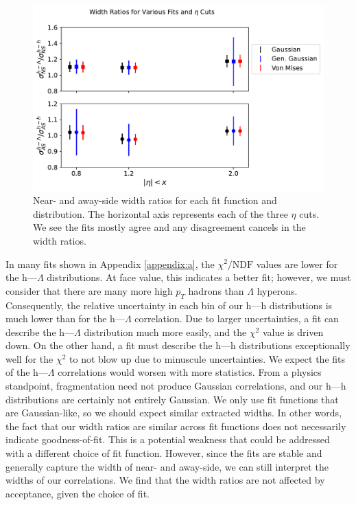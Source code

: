 \documentclass[../main.tex]{subfiles}
\begin{document}
\begin{figure}[h]
    \centering
    \includegraphics[scale=0.7]{results/figs/ratios-across-fits.pdf}
    \caption{Near- and away-side width ratios for each fit function and distribution. The horizontal axis represents each of the three $\eta$ cuts. We see the fits mostly agree and any disagreement cancels in the width ratios.}
    \label{fig:fit_ratios}
\end{figure}

In many fits shown in Appendix \ref{appendix:a}, the $\chi^2/\text{NDF}$ values are lower for the h---$\Lambda$ distributions. At face value, this indicates a better fit; however, we must consider that there are many more high $p_T$ hadrons than $\Lambda$ hyperons. Consequently, the relative uncertainty in each bin of our h---h distributions is much lower than for the h---$\Lambda$ correlation. Due to larger uncertainties, a fit can describe the h---$\Lambda$ distribution much more easily, and the $\chi^2$ value is driven down. On the other hand, a fit must describe the h---h distributions exceptionally well for the $\chi^2$ to not blow up due to minuscule uncertainties. We expect the fits of the h---$\Lambda$ correlations would worsen with more statistics. From a physics standpoint, fragmentation need not produce Gaussian correlations, and our h---h distributions are certainly not entirely Gaussian. We only use fit functions that are Gaussian-like, so we should expect similar extracted widths. In other words, the fact that our width ratios are similar across fit functions does not necessarily indicate goodness-of-fit. This is a potential weakness that could be addressed with a different choice of fit function. However, since the fits are stable and generally capture the width of near- and away-side, we can still interpret the widths of our correlations. We find that the width ratios are not affected by acceptance, given the choice of fit. 
\end{document}
